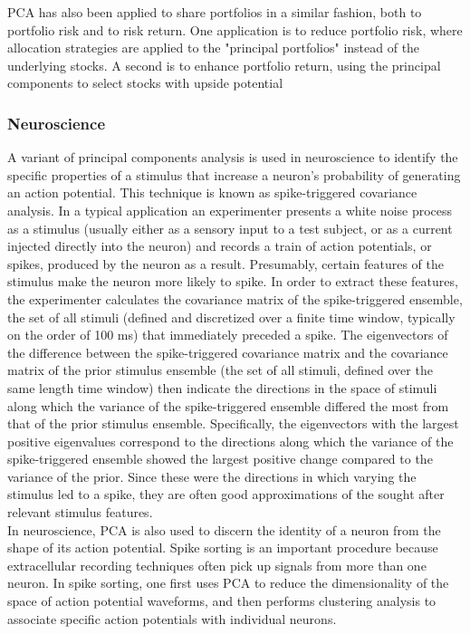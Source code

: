 \documentclass[12pt]{article}
\theoremstyle{plain}
\begin{document}
PCA has also been applied to share portfolios in a similar fashion, both to portfolio risk and to risk return. One application is to reduce portfolio risk, where allocation strategies are applied to the "principal portfolios" instead of the underlying stocks. A second is to enhance portfolio return, using the principal components to select stocks with upside potential

\subsubsection{Neuroscience}

A variant of principal components analysis is used in neuroscience to identify the specific properties of a stimulus that increase a neuron's probability of generating an action potential. This technique is known as spike-triggered covariance analysis. In a typical application an experimenter presents a white noise process as a stimulus (usually either as a sensory input to a test subject, or as a current injected directly into the neuron) and records a train of action potentials, or spikes, produced by the neuron as a result. Presumably, certain features of the stimulus make the neuron more likely to spike. In order to extract these features, the experimenter calculates the covariance matrix of the spike-triggered ensemble, the set of all stimuli (defined and discretized over a finite time window, typically on the order of 100 ms) that immediately preceded a spike. The eigenvectors of the difference between the spike-triggered covariance matrix and the covariance matrix of the prior stimulus ensemble (the set of all stimuli, defined over the same length time window) then indicate the directions in the space of stimuli along which the variance of the spike-triggered ensemble differed the most from that of the prior stimulus ensemble. Specifically, the eigenvectors with the largest positive eigenvalues correspond to the directions along which the variance of the spike-triggered ensemble showed the largest positive change compared to the variance of the prior. Since these were the directions in which varying the stimulus led to a spike, they are often good approximations of the sought after relevant stimulus features.\cite{wiki_pca}
\\
 

In neuroscience, PCA is also used to discern the identity of a neuron from the shape of its action potential. Spike sorting is an important procedure because extracellular recording techniques often pick up signals from more than one neuron. In spike sorting, one first uses PCA to reduce the dimensionality of the space of action potential waveforms, and then performs clustering analysis to associate specific action potentials with individual neurons.
\\
\end{document}
